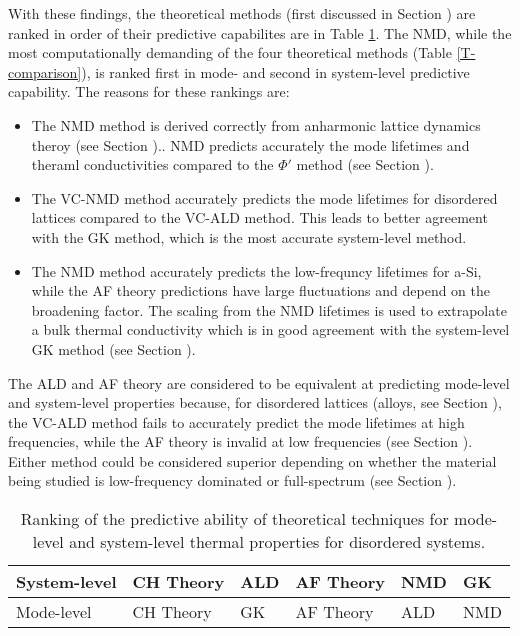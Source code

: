 With these findings, the theoretical methods (first discussed in 
Section ) are ranked in order of their predictive capabilites are in 
Table \ref{T-comparison-predictive}. The NMD, while the most 
computationally demanding of the four theoretical methods 
(Table \ref{T-comparison}), 
is ranked first in mode- and second in system-level predictive 
capability. The reasons for these rankings are:

\begin{itemize}
\item The NMD method is derived correctly from anharmonic lattice dynamics 
theroy (see Section ).. NMD predicts accurately the mode lifetimes and 
theraml conductivities compared to the $\Phi'$ method (see Section ).
\item The VC-NMD method accurately predicts the mode lifetimes for 
disordered lattices compared to the VC-ALD method. This leads to better 
agreement with the GK method, which is the most accurate system-level 
method.
\item The NMD method accurately predicts the low-frequncy lifetimes 
for a-Si, while the AF theory predictions have large fluctuations and 
depend on the broadening factor. The scaling from the NMD lifetimes is 
used to extrapolate a bulk thermal conductivity which is in good 
agreement with the system-level GK method (see Section ). 
\end{itemize}

The ALD and AF theory are considered to be equivalent at predicting 
mode-level and system-level properties because, for disordered lattices 
(alloys, see Section ), the VC-ALD method fails to accurately 
predict the mode lifetimes at high frequencies, 
while the AF theory is invalid at low frequencies 
(see Section ). Either 
method could be considered superior depending on whether the material 
being studied is low-frequency dominated or full-spectrum 
(see Section ). 

\begin{center}
\begin{table}
\small
\caption{\label{T-comparison-predictive}Ranking of the predictive ability of 
theoretical techniques for mode-level and system-level thermal 
properties for disordered systems.}
\begin{tabular}{p{0.9in}|p{0.9in}|p{0.9in}|p{0.9in}|p{0.9in}|p{0.9in}}
\hline\hline
System-level
&CH Theory 
&ALD 
&AF Theory 
&NMD 
&GK \\ 
\hline
Mode-level
&CH Theory 
&GK
&AF Theory
&ALD
&NMD \\ 
\hline\hline
\end{tabular}
\end{table}
\end{center}

